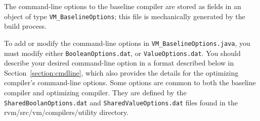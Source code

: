 The command-line options to the baseline compiler are
stored as fields in an object of type {\tt VM\_BaselineOptions}; this
file is mechanically generated by the build process. 

To add or modify the command-line options in {\tt VM\_BaselineOptions.java},
you must modify either {\tt BooleanOptions.dat}, or {\tt ValueOptions.dat}.
You should describe your desired command-line option in a format 
described below in Section~\ref{section:cmdline}, which 
also provides the details for the optimizing compiler's command-line options.
Some options are common to both the baseline compiler and optimizing
compiler. They are defined by the {\tt SharedBoolanOptions.dat} and
{\tt SharedValueOptions.dat} files found in the
rvm/src/vm/compilers/utility directory. 
